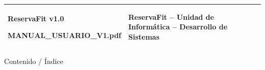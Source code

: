 \documentclass[11pt,a4paper]{article}
\begin{document}
\vspace{1.5cm}

\noindent
\begin{tabularx}{\linewidth}{|p{5cm}|X|p{2cm}|}
  \hline
  \fontsize{8pt}{9pt}\selectfont ReservaFit v1.0 \par MANUAL\_USUARIO\_V1.pdf & 
  \centering \fontsize{8pt}{9pt}\selectfont ReservaFit – Unidad de Informática – Desarrollo de Sistemas & 
  \hfill \fontsize{8pt}{9pt}\selectfont 1 \\
  \hline
\end{tabularx}

\newpage

\begin{sectionbanner}{Contenido / Índice}
\end{sectionbanner}
\end{document}
